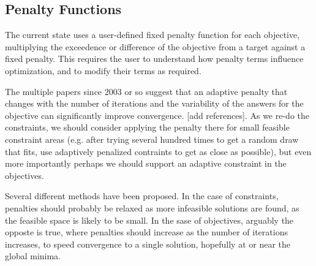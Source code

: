 \documentclass[12pt,letterpaper,english]{article}
\begin{document}
\subsection{Penalty Functions \label{sec:penalty}}
The current state uses a user-defined fixed penalty function for each objective, multiplying the exceedence or difference of the objective from a target against a fixed penalty.  This requires the user to understand how penalty terms influence optimization, and to modify their terms as required.

The multiple papers since 2003 or so suggest that an adaptive penalty that changes with the number of iterations and the variability of the answers for the objective can significantly improve convergence. [add references].  As we re-do the constraints, we should consider applying the penalty there for small feasible constraint areas (e.g. after trying several hundred times to get a random draw that fits, use adaptively penalized contraints to get as close as possible), but even more importantly perhaps we should support an adaptive constraint in the objectives.

Several different methods have been proposed.  In the case of constraints,
penalties should probably be relaxed as more infeasible solutions are found, as the feasible space is likely to be small.  In the sase of objectives, arguably the opposte is true, where penalties should increase as the number of iterations increases, to speed convergence to a single solution, hopefully at or near the global minima.


%
%
\end{document}
